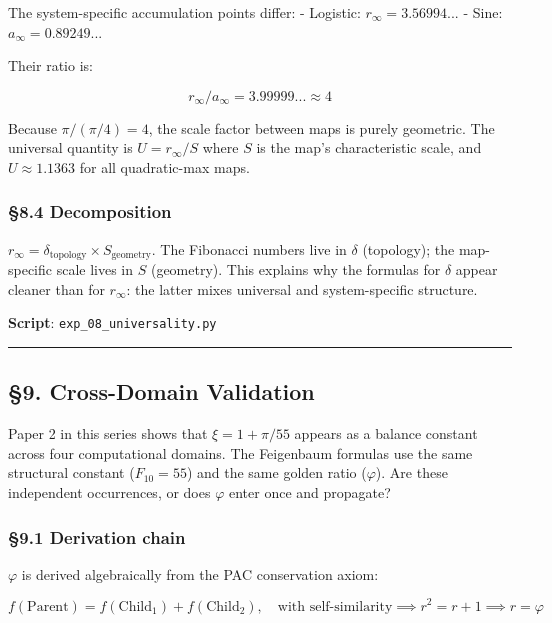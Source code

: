 \documentclass[
  11pt,
  a4paper]{article}
\begin{document}
The system-specific accumulation points differ: - Logistic:
\(r_\infty = 3.56994...\) - Sine: \(a_\infty = 0.89249...\)

Their ratio is:

\[r_\infty / a_\infty = 3.99999...\approx 4\]

Because \(\pi / (\pi/4) = 4\), the scale factor between maps is purely
geometric. The universal quantity is \(U = r_\infty / S\) where \(S\) is
the map's characteristic scale, and \(U \approx 1.1363\) for all
quadratic-max maps.

\subsubsection{§8.4 Decomposition}\label{decomposition}

\(r_\infty = \delta_\text{topology} \times S_\text{geometry}\). The
Fibonacci numbers live in \(\delta\) (topology); the map-specific scale
lives in \(S\) (geometry). This explains why the formulas for \(\delta\)
appear cleaner than for \(r_\infty\): the latter mixes universal and
system-specific structure.

\textbf{Script}: \texttt{exp\_08\_universality.py}

\begin{center}\rule{0.5\linewidth}{0.5pt}\end{center}

\subsection{§9. Cross-Domain Validation}\label{cross-domain-validation}

Paper 2 in this series shows that \(\xi = 1 + \pi/55\) appears as a
balance constant across four computational domains. The Feigenbaum
formulas use the same structural constant (\(F_{10} = 55\)) and the same
golden ratio (\(\varphi\)). Are these independent occurrences, or does
\(\varphi\) enter once and propagate?

\subsubsection{§9.1 Derivation chain}\label{derivation-chain}

\(\varphi\) is derived algebraically from the PAC conservation axiom:

\[f(\text{Parent}) = f(\text{Child}_1) + f(\text{Child}_2), \quad \text{with self-similarity} \implies r^2 = r + 1 \implies r = \varphi\]
\end{document}
